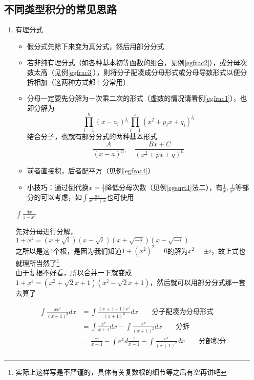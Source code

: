 \subsection{不同类型积分的常见思路}
\begin{enumerate}
	\item 有理分式
	\begin{itemize}
		\item 假分式先除下来变为真分式，然后用部分分式
		\item 若非纯有理分式（如各种基本初等函数的组合，见例\ref{egfrac2}），或分母次数太高（见例\ref{egfrac3}），则将分子配凑成分母形式或分母导数形式以便分拆相加（这两种方式都十分常用）
		\item 分母一定要先分解为一次乘二次的形式（虚数的情况请看例\ref{egfrac1}），也即分解为
			\[\prod_{i=1}^k(x-a_i)^{j_i}\prod_{i=1}^s(x^2+p_ix+q_i)^{l_i}\]
			结合分子，也就有部分分式的两种基本形式
			\[\frac{A}{(x-a)^n},\quad\frac{Bx+C}{(x^2+px+q)^n}\]
		\item 前者直接积，后者配平方（见例\ref{egfrac4}）
		\item 小技巧：通过倒代换$\displaystyle x=\frac{1}{t}$降低分母次数（见例\ref{egsqrt1}法二），有$\displaystyle\frac{1}{x},\frac{1}{x^2}$等部分的可以考虑，如$\displaystyle\int\frac{dx}{x^{100}+x}$也可使用
	\end{itemize}
	\begin{example}
		\label{egfrac1}
		$\displaystyle\int\frac{dx}{1+x^4}$
	\end{example}
	\begin{analysis}
		先对分母进行分解，$1+x^4=(x+\sqrt{i})(x-\sqrt{i})(x+\sqrt{-i})(x-\sqrt{-i})$\\
		之所以是这$4$个根，是因为我们知道$1+(x^2)^2=0$的解为$x^2=\pm i$，故上式也就理所当然了\footnote{实际上这样写是不严谨的，具体有关复数根的细节等之后有空再讲吧}\\
		由于复根不好看，所以合并一下就变成$1+x^4=(x^2+\sqrt{2}x+1)(x^2-\sqrt{2}x+1)$，然后就可以用部分分式那一套去算了
	\end{analysis}
	\begin{example}
		\label{egfrac2}
		\begin{equation*}
		\begin{aligned}
			\int \frac{xe^x}{(x+1)^2}dx &= \int \frac{(x+1-1)e^x}{(x+1)^2}dx\qquad\mbox{分子配凑为分母形式}\\
			&= \int \frac{e^x}{x+1}dx - \int \frac{e^x}{(x+1)^2}dx\qquad\mbox{分拆}\\
			&= \frac{e^x}{x+1}-\int e^xd\frac{1}{x+1} - \int \frac{e^x}{(x+1)^2}dx\qquad\mbox{分部积分}\\

\end{aligned}
\end{equation*}
\end{example}
\end{enumerate}
